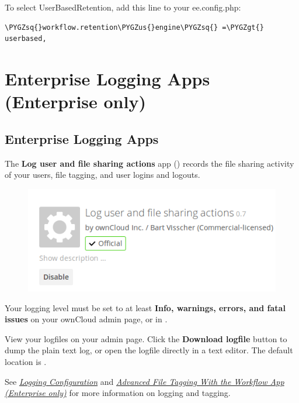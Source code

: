 \documentclass[letterpaper,10pt,english]{sphinxmanual}
\def\PYGZus{\char`\_}
\def\PYGZgt{\char`\>}
\def\PYGZsq{\char`\'}
\begin{document}
To select UserBasedRetention, add this line to your ee.config.php:

\begin{Verbatim}[commandchars=\\\{\}]
\PYGZsq{}workflow.retention\PYGZus{}engine\PYGZsq{} =\PYGZgt{} userbased,
\end{Verbatim}


\section{Enterprise Logging Apps (Enterprise only)}
\label{enterprise_logging/index:enterprise-logging-apps-enterprise-only}\label{enterprise_logging/index::doc}

\subsection{Enterprise Logging Apps}
\label{enterprise_logging/enterprise_logging_apps:enterprise-logging-apps}\label{enterprise_logging/enterprise_logging_apps::doc}
The \textbf{Log user and file sharing actions} app () records the
file sharing activity of your users, file tagging, and user logins and logouts.
\begin{figure}[htbp]
\centering

\includegraphics{logging-1.png}
\end{figure}

Your logging level must be set to at least \textbf{Info, warnings, errors, and fatal
issues} on your ownCloud admin page, or  in .

View your logfiles on your admin page. Click the \textbf{Download logfile} button to
dump the plain text log, or open the logfile directly in a text editor. The
default location is .

See {\hyperref[configuration_server/logging_configuration::doc]{\emph{Logging Configuration}}} and
{\hyperref[enterprise_file_management/files_tagging::doc]{\emph{Advanced File Tagging With the Workflow App (Enterprise only)}}} for more information on
logging and tagging.
\end{document}
